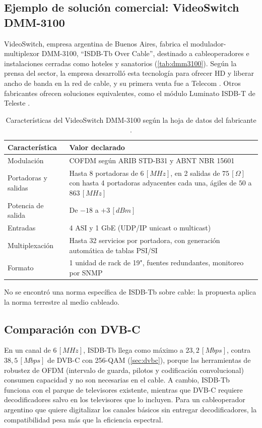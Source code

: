 \subsection{Ejemplo de solución comercial: VideoSwitch DMM-3100}
VideoSwitch, empresa argentina de Buenos Aires, fabrica el modulador-multiplexor DMM-3100, ``ISDB-Tb Over Cable'', destinado a cableoperadores e instalaciones cerradas como hoteles y sanatorios (\autoref{tab:dmm3100}). Según la prensa del sector, la empresa desarrolló esta tecnología para ofrecer HD y liberar ancho de banda en la red de cable, y su primera venta fue a Telecom \cite{prensario_videoswitch}. Otros fabricantes ofrecen soluciones equivalentes, como el módulo Luminato ISDB-T de Teleste \cite{teleste_isdbt}.

\begin{table}[H]
    \centering
    \caption{Características del VideoSwitch DMM-3100 según la hoja de datos del fabricante \cite{videoswitch_dmm}.}
    \label{tab:dmm3100}
    \begin{tabular}{p{4cm} p{10.2cm}}
        \toprule
        \textbf{Característica} & \textbf{Valor declarado} \\
        \midrule
        Modulación & COFDM según ARIB STD-B31 y ABNT NBR 15601 \\
        Portadoras y salidas & Hasta 8 portadoras de $6 \, [MHz]$, en 2 salidas de $75 \, [\Omega]$ con hasta 4 portadoras adyacentes cada una, ágiles de $50$ a $863 \, [MHz]$ \\
        Potencia de salida & De $-18$ a $+3 \, [dBm]$ \\
        Entradas & 4 ASI y 1 GbE (UDP/IP unicast o multicast) \\
        Multiplexación & Hasta 32 servicios por portadora, con generación automática de tablas PSI/SI \\
        Formato & 1 unidad de rack de 19", fuentes redundantes, monitoreo por SNMP \\
        \bottomrule
    \end{tabular}
\end{table}

No se encontró una norma específica de ISDB-Tb sobre cable: la propuesta aplica la norma terrestre al medio cableado.

\subsection{Comparación con DVB-C}
En un canal de $6 \, [MHz]$, ISDB-Tb llega como máximo a $23{,}2 \, [Mbps]$, contra $38{,}5 \, [Mbps]$ de DVB-C con 256-QAM (\autoref{sec:dvbc}), porque las herramientas de robustez de OFDM (intervalo de guarda, pilotos y codificación convolucional) consumen capacidad y no son necesarias en el cable. A cambio, ISDB-Tb funciona con el parque de televisores existente, mientras que DVB-C requiere decodificadores salvo en los televisores que lo incluyen. Para un cableoperador argentino que quiere digitalizar los canales básicos sin entregar decodificadores, la compatibilidad pesa más que la eficiencia espectral.
